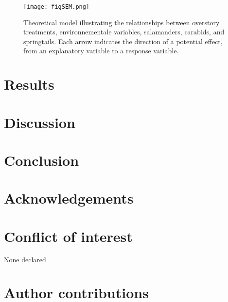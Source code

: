 \begin{figure}[ht!]
	\centering
	\texttt{[image: figSEM.png]}
	\caption[Theoretical model illustrating the relationships between overstory treatments, environmental variables and taxa.]{Theoretical model illustrating the relationships between overstory treatments, environnementale variables, salamanders, carabids, and springtails. 
  Each arrow indicates the direction of a potential effect, from an explanatory variable to a response variable.}
	\label{fig:SEM}
	\end{figure}  

\clearpage

\section*{Results}
\label{sec:results1}

\clearpage

\section*{Discussion}
\label{sec:discu1}

\section*{Conclusion}
\label{sec:conclu1}

\section*{Acknowledgements}
\label{sec:acknowl1}

\section*{Conflict of interest}
\label{sec:conflict1}

None declared

\section*{Author contributions}
\label{sec:author1}

\cleardoublepage

\begin{otherlanguage}{english}

\end{otherlanguage}
